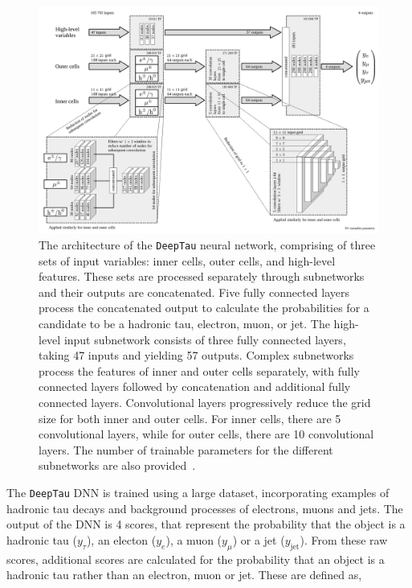 \begin{figure}[!hbtp]
\centering
    \includegraphics[width=\textwidth]{Figures/deeptau.pdf}
\caption{The architecture of the \texttt{DeepTau} neural network, comprising of three sets of input variables: inner cells, outer cells, and high-level features. These sets are processed separately through subnetworks and their outputs are concatenated. Five fully connected layers process the concatenated output to calculate the probabilities for a candidate to be a hadronic tau, electron, muon, or jet. The high-level input subnetwork consists of three fully connected layers, taking 47 inputs and yielding 57 outputs. Complex subnetworks process the features of inner and outer cells separately, with fully connected layers followed by concatenation and additional fully connected layers. Convolutional layers progressively reduce the grid size for both inner and outer cells. For inner cells, there are 5 convolutional layers, while for outer cells, there are 10 convolutional layers. The number of trainable parameters for the different subnetworks are also provided~\cite{CMS:2022prd}.}
\label{fig:deeptau}
\end{figure}

The \texttt{DeepTau} \ac{DNN} is trained using a large dataset, incorporating examples of hadronic tau decays and background processes of electrons, muons and jets. 
The output of the \ac{DNN} is 4 scores, that represent the probability that the object is a hadronic tau ($y_\tau$), an electon ($y_e$), a muon ($y_\mu$) or a jet ($y_{\text{jet}}$).
From these raw scores, additional scores are calculated for the probability that an object is a hadronic tau rather than an electron, muon or jet.
These are defined as,

